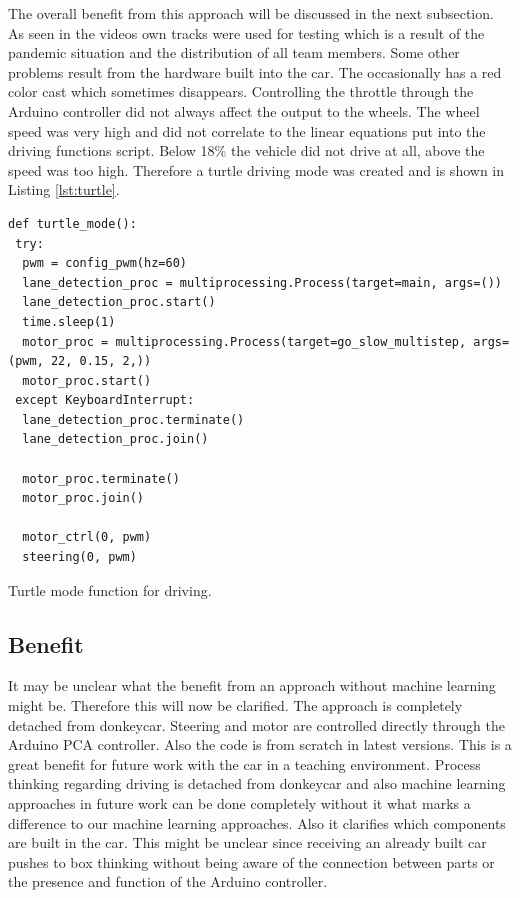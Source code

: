 \documentclass[conference]{IEEEtran}
\begin{document}
The overall benefit from this approach will be discussed in the next subsection.
As seen in the videos own tracks were used for testing which is a result of the pandemic situation and the distribution of all team members.
Some other problems result from the hardware built into the car.
The occasionally has a red color cast which sometimes disappears.
Controlling the throttle through the Arduino controller did not always affect the output to the wheels.
The wheel speed was very high and did not correlate to the linear equations put into the driving functions script.
Below 18\% the vehicle did not drive at all, above the speed was too high.
Therefore a turtle driving mode was created and is shown in Listing \ref{lst:turtle}.

\begin{mylist}[h]
\begin{verbatim}
def turtle_mode():
 try:
  pwm = config_pwm(hz=60)
  lane_detection_proc = multiprocessing.Process(target=main, args=())
  lane_detection_proc.start()
  time.sleep(1)
  motor_proc = multiprocessing.Process(target=go_slow_multistep, args=(pwm, 22, 0.15, 2,))
  motor_proc.start()
 except KeyboardInterrupt:
  lane_detection_proc.terminate()
  lane_detection_proc.join()

  motor_proc.terminate()
  motor_proc.join()

  motor_ctrl(0, pwm)
  steering(0, pwm)
\end{verbatim}
\caption{Turtle mode function for driving.}
\label{lst:turtle}
\end{mylist}

\subsection{Benefit}

It may be unclear what the benefit from an approach without machine learning might be.
Therefore this will now be clarified.
The approach is completely detached from donkeycar.
Steering and motor are controlled directly through the Arduino PCA controller.
Also the code is from scratch in latest versions.
This is a great benefit for future work with the car in a teaching environment.
Process thinking regarding driving is detached from donkeycar and also machine learning approaches in future work can be done completely without it what marks a difference to our machine learning approaches.
Also it clarifies which components are built in the car.
This might be unclear since receiving an already built car pushes to box thinking without being aware of the connection between parts or the presence and function of the Arduino controller.
\end{document}
